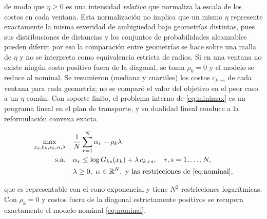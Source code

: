 de modo que $\eta\ge0$ es una intensidad \emph{relativa} que normaliza la escala de los costos en cada ventana. Esta normalización no implica que un mismo $\eta$ represente exactamente la misma severidad de ambigüedad bajo geometrías distintas, pues sus distribuciones de distancias y los conjuntos de probabilidades alcanzables pueden diferir; por eso la comparación entre geometrías se hace sobre una malla de $\eta$ y no se interpreta como equivalencia estricta de radios. Si en una ventana no existe ningún costo positivo fuera de la diagonal, se toma $\rho_k=0$ y el modelo se reduce al nominal. 
Se resumieron (mediana y cuartiles) los costos $c_{k,rs}$ de cada ventana para cada geometría; no se comparó el valor del objetivo en el peor caso a un $\eta$ común.
Con soporte finito, el problema interno de \eqref{eq:minimax} es un programa lineal en el plan de transporte, y su dualidad lineal \citep[como en][]{mohajerin2018,kuhn2019} conduce a la reformulación convexa exacta

\begin{equation}\label{eq:dual}
\begin{aligned}
\max_{x_k,b_k,s_k,\alpha,\lambda}\quad & \frac1N\sum_{r=1}^N\alpha_r-\rho_k\lambda\\
\text{s.a.}\quad & \alpha_r\le\log G_{ks}(x_k)+\lambda\,c_{k,rs},\quad r,s=1,\dots,N,\\
& \lambda\ge0,\ \alpha\in\mathbb R^N,\ \text{y las restricciones de \eqref{eq:nominal}},
\end{aligned}
\end{equation}

que es representable con el cono exponencial y tiene $N^2$ restricciones logarítmicas. Con $\rho_k=0$ y costos fuera de la diagonal estrictamente positivos se recupera exactamente el modelo nominal \eqref{eq:nominal}.


